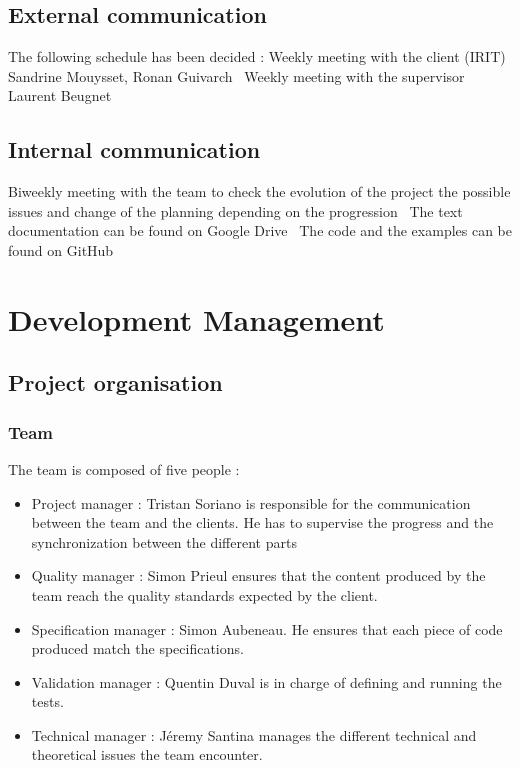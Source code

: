 \documentclass[12pt]{article} %
\begin{document}
\subsection{External communication}
The following schedule has been decided :
Weekly meeting with the client (IRIT) Sandrine Mouysset, Ronan Guivarch
\
Weekly meeting with the supervisor Laurent Beugnet
\
\subsection{Internal communication}
Biweekly meeting with the team to check the evolution of the project the possible issues and change of the planning depending on the progression
\
The text documentation can be found on Google Drive
\
The code and the examples can be found on  GitHub

\section{Development Management}
\subsection{Project organisation}
\subsubsection{Team}
The team is composed of five people :
\begin{itemize}
\item Project manager : Tristan Soriano is responsible for the communication between the team and the clients. He has to supervise the progress and the synchronization between the different parts
\item Quality manager : Simon Prieul ensures that the content produced by the team  reach the quality standards expected by the client.
\item Specification manager : Simon Aubeneau. He ensures that each piece of code produced match the specifications.
\item Validation manager : Quentin Duval is in charge of defining and running the tests.
\item Technical manager : Jéremy Santina manages the different technical and theoretical issues the team encounter.
\end{itemize}
\end{document}

